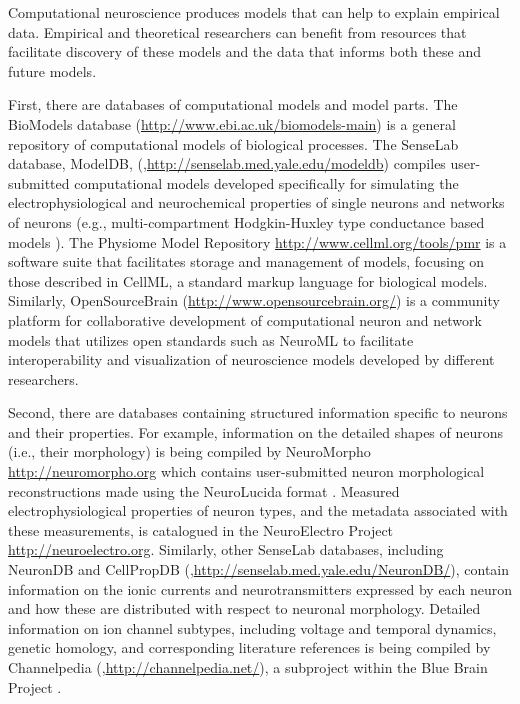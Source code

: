 \documentclass[12pt]{article}
\begin{document}
Computational neuroscience produces models that can help to explain empirical data. 
Empirical and theoretical researchers can benefit from resources that facilitate discovery of these models and the data that informs both these and future models.   

First, there are databases of computational models and model parts.  
The BioModels database (\url{http://www.ebi.ac.uk/biomodels-main}) is a general repository of computational models of biological processes.  
The SenseLab database, ModelDB, (\cite{migliore_modeldb_2003},\url{http://senselab.med.yale.edu/modeldb}) compiles user-submitted computational models developed specifically for simulating the electrophysiological and neurochemical properties of single neurons and networks of neurons (e.g., multi-compartment Hodgkin-Huxley type conductance based models \cite{hodgkin_quantitative_1952}). 
The Physiome Model Repository \url{http://www.cellml.org/tools/pmr} is a software suite that facilitates storage and management of models, focusing on those described in CellML, a standard markup language for biological models. 
Similarly, OpenSourceBrain (\url{http://www.opensourcebrain.org/}) is a community platform for collaborative development of computational neuron and network models that utilizes open standards such as NeuroML \cite{gleeson_neuroml:_2010} to facilitate interoperability and visualization of neuroscience models developed by different researchers. 

Second, there are databases containing structured information specific to neurons and their properties. 
For example, information on the detailed shapes of neurons (i.e., their morphology) is being compiled by NeuroMorpho \url{http://neuromorpho.org} which contains user-submitted neuron morphological reconstructions made using the NeuroLucida format \cite{glaser_neuron_1990}. 
Measured electrophysiological properties of neuron types, and the metadata associated with these measurements, is catalogued in the NeuroElectro Project \url{http://neuroelectro.org}.  
Similarly, other SenseLab databases, including NeuronDB and CellPropDB (\cite{crasto_senselab:_2007},\url{http://senselab.med.yale.edu/NeuronDB/}), contain information on the ionic currents and neurotransmitters expressed by each neuron and how these are distributed with respect to neuronal morphology. 
Detailed information on ion channel subtypes, including voltage and temporal dynamics, genetic homology, and corresponding literature references is being compiled by Channelpedia (\cite{ranjan_channelpedia:_2011},\url{http://channelpedia.net/‎}), a subproject within the Blue Brain Project \citep{markram_blue_2006}. 
\end{document}

